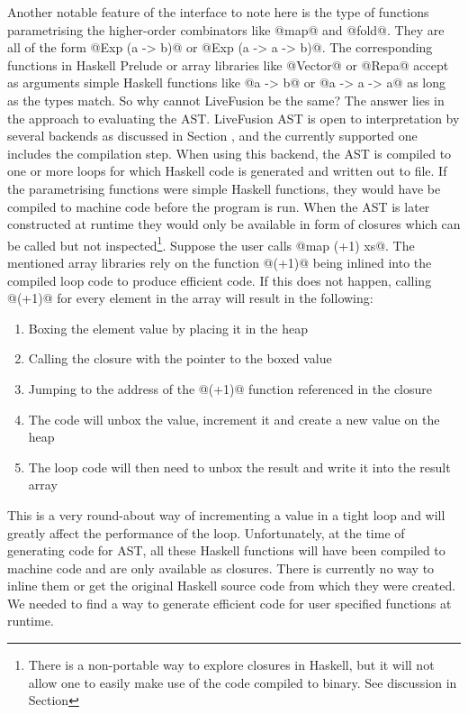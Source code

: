 \documentclass[preamble.tex]{subfiles}
\begin{document}
Another notable feature of the interface to note here is the type of functions parametrising the higher-order combinators like @map@ and @fold@. They are all of the form @Exp (a -> b)@ or @Exp (a -> a -> b)@. The corresponding functions in Haskell Prelude or array libraries like @Vector@ or @Repa@ accept as arguments simple Haskell functions like @a -> b@ or @a -> a -> a@ as long as the types match. So why cannot LiveFusion be the same? The answer lies in the approach to evaluating the AST. LiveFusion AST is open to interpretation by several backends as discussed in Section , and the currently supported one includes the compilation step. When using this backend, the AST is compiled to one or more loops for which Haskell code is generated and written out to file. If the parametrising functions were simple Haskell functions, they would have be compiled to machine code before the program is run. When the AST is later constructed at runtime they would only be available in form of closures which can be called but not inspected\footnote{There is a non-portable way to explore closures in Haskell, but it will not allow one to easily make use of the code compiled to binary. See discussion in Section }. Suppose the user calls @map (+1) xs@. The mentioned array libraries rely on the function @(+1)@ being inlined into the compiled loop code to produce efficient code. If this does not happen, calling @(+1)@ for every element in the array will result in the following:
\begin{enumerate}
\item Boxing the element value by placing it in the heap
\item Calling the closure with the pointer to the boxed value
\item Jumping to the address of the @(+1)@ function referenced in the closure
\item The code will unbox the value, increment it and create a new value on the heap
\item The loop code will then need to unbox the result and write it into the result array
\end{enumerate}

This is a very round-about way of incrementing a value in a tight loop and will greatly affect the performance of the loop. Unfortunately, at the time of generating code for AST, all these Haskell functions will have been compiled to machine code and are only available as closures. There is currently no way to inline them or get the original Haskell source code from which they were created. We needed to find a way to generate efficient code for user specified functions at runtime.
\end{document}

